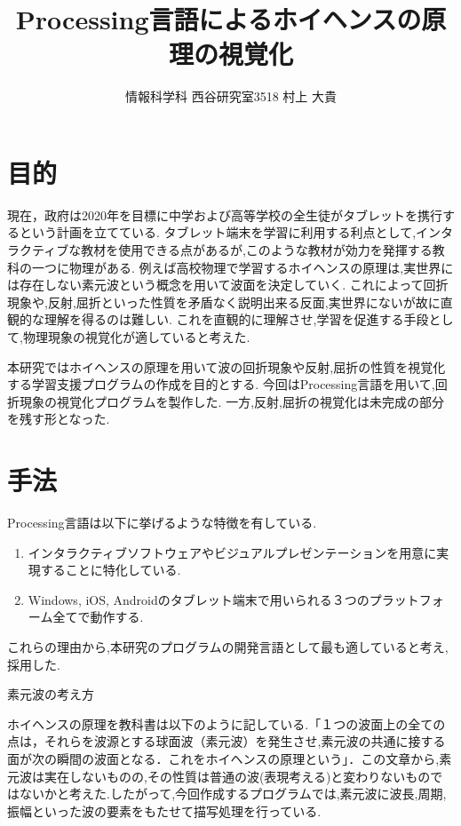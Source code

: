 \documentclass[a4j,twocolumn,uplatex]{jarticle}
\begin{document}
\title{Processing言語によるホイヘンスの原理の視覚化}
\author{情報科学科 西谷研究室3518 村上 大貴}
\date{}
\maketitle
\section{目的}
現在，政府は2020年を目標に中学および高等学校の全生徒がタブレットを携行するという計画を立てている\cite{tablet}.
タブレット端末を学習に利用する利点として,インタラクティブな教材を使用できる点があるが,このような教材が効力を発揮する教科の一つに物理がある.
例えば高校物理で学習するホイヘンスの原理は,実世界には存在しない素元波という概念を用いて波面を決定していく. これによって回折現象や,反射,屈折といった性質を矛盾なく説明出来る反面,実世界にないが故に直観的な理解を得るのは難しい.
これを直観的に理解させ,学習を促進する手段として,物理現象の視覚化が適していると考えた.

本研究ではホイヘンスの原理を用いて波の回折現象や反射,屈折の性質を視覚化する学習支援プログラムの作成を目的とする.
今回はProcessing言語を用いて,回折現象の視覚化プログラムを製作した. 一方,反射,屈折の視覚化は未完成の部分を残す形となった.
\vspace{-4mm}

\section{手法}
Processing言語は以下に挙げるような特徴を有している\cite{isikawa}.
\begin{enumerate}
\item インタラクティブソフトウェアやビジュアルプレゼンテーションを用意に実現することに特化している.
\item Windows, iOS, Androidのタブレット端末で用いられる３つのプラットフォーム全てで動作する. 
\end{enumerate}
これらの理由から,本研究のプログラムの開発言語として最も適していると考え,採用した.

素元波の考え方

ホイヘンスの原理を教科書は以下のように記している.「１つの波面上の全ての点は，それらを波源とする球面波（素元波）を発生させ,素元波の共通に接する面が次の瞬間の波面となる．これをホイヘンスの原理という」\cite{kyoukasyo}．この文章から,素元波は実在しないものの,その性質は普通の波(表現考える)と変わりないものではないかと考えた.したがって,今回作成するプログラムでは,素元波に波長,周期,振幅といった波の要素をもたせて描写処理を行っている.
\end{document}

